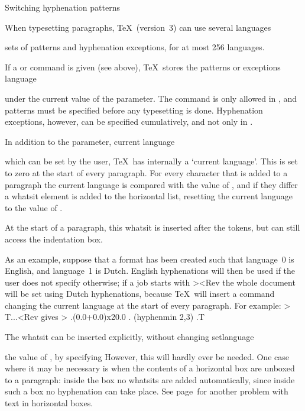 \point Switching hyphenation patterns

When typesetting paragraphs, \TeX\ (version~3) can use several
\alt
\term languages\par
sets of patterns and hyphenation exceptions, for at most 256
languages. 

If a  or 
command is given (see above), \TeX\ stores the patterns or exceptions
\csterm language\par
under the current value of the  parameter.
The  command is only allowed in \IniTeX, and
patterns must be specified before any typesetting is done.
Hyphenation exceptions, however, can
be specified cumulatively, and not only in \IniTeX.

In addition to the  parameter, 
\term current language\par
which can be set by the user, \TeX\ has internally a `current
language'. This is set to zero at the start of every paragraph.
For every character that is added to a paragraph
the current language is compared with the value of ,
and if they differ  a whatsit element is added to the horizontal
list, resetting the current language to the value of .

At the start of a paragraph, this whatsit is inserted
\altt
after the  tokens, but 
can still access the indentation box.

As an example, suppose that a format has been created such that
language~0 is English, and language~1 is Dutch. English hyphenations
will then be used if the user does not specify otherwise;
if a job starts with \Ver><Rev the whole document
will be set using Dutch hyphenations, because \TeX\ will insert
a command changing the current language at the start of
every paragraph. For example:
\Ver>
T...<Rev gives
\Ver>
.\hbox(0.0+0.0)x20.0           %
. (hyphenmin 2,3) %
.\tenrm T                      %

The whatsit can be inserted explicitly, without changing
\csterm setlanguage\par
the value of , by specifying
\disp{}\dispstop
However, this will hardly ever be needed.
One case where it may be necessary is when the contents of
a horizontal box are unboxed to a paragraph: inside the box no
whatsits are added automatically, since inside such a box
no hyphenation can take place.
See page~ for another problem with text
in horizontal boxes.

\endinput






